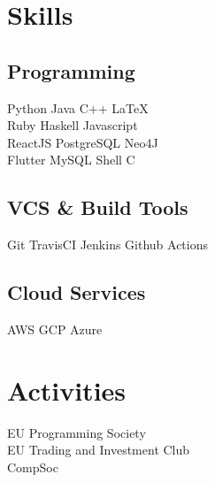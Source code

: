 \documentclass[]{deedy-resume-openfont}
\begin{document}
\begin{minipage}[t]{0.33\textwidth}
\section{Skills}
\subsection{Programming}
Python \textbullet{} Java \textbullet{} C++ \textbullet{} \LaTeX\ \\ 
Ruby \textbullet{} Haskell \textbullet{} Javascript \\
ReactJS \textbullet{} PostgreSQL \textbullet{} Neo4J \\
Flutter \textbullet{} MySQL \textbullet{} Shell \textbullet{} C
\subsection{VCS \& Build Tools}
Git \textbullet{} TravisCI \textbullet{}Jenkins \textbullet{} Github Actions
\subsection{Cloud Services}
AWS \textbullet{} GCP \textbullet{} Azure
\sectionsep

\section{Activities}
EU Programming Society \\
EU Trading and Investment Club \\
CompSoc \\

\end{minipage}%
\end{document}
